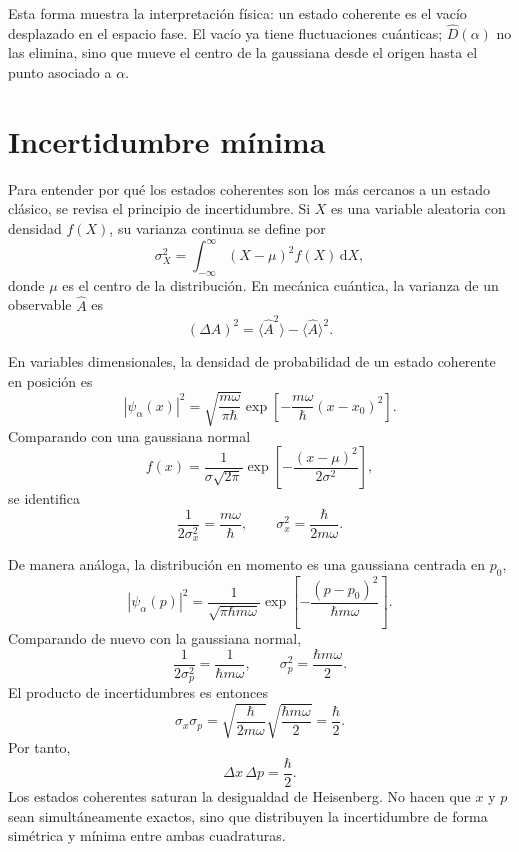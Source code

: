 \documentclass[11pt]{article}
\newcommand{\dd}{\mathrm{d}}
\begin{document}
Esta forma muestra la interpretaci\'on f\'isica: un estado coherente es el
vac\'io desplazado en el espacio fase. El vac\'io ya tiene fluctuaciones
cu\'anticas; $\hat D(\alpha)$ no las elimina, sino que mueve el centro de la
gaussiana desde el origen hasta el punto asociado a $\alpha$.

\section{Incertidumbre m\'inima}

Para entender por qu\'e los estados coherentes son los m\'as cercanos a un
estado cl\'asico, se revisa el principio de incertidumbre. Si $X$ es una
variable aleatoria con densidad $f(X)$, su varianza continua se define por
\begin{equation}
  \sigma_X^2
  =
  \int_{-\infty}^{\infty}(X-\mu)^2f(X)\,\dd X,
\end{equation}
donde $\mu$ es el centro de la distribuci\'on. En mec\'anica cu\'antica, la
varianza de un observable $\hat A$ es
\begin{equation}
  (\Delta A)^2
  =
  \langle \hat A^2\rangle-\langle \hat A\rangle^2.
\end{equation}

En variables dimensionales, la densidad de probabilidad de un estado coherente
en posici\'on es
\begin{equation}
  |\psi_\alpha(x)|^2
  =
  \sqrt{\frac{m\omega}{\pi\hbar}}
  \exp\left[-\frac{m\omega}{\hbar}(x-x_0)^2\right].
\end{equation}
Comparando con una gaussiana normal
\begin{equation}
  f(x)=\frac{1}{\sigma\sqrt{2\pi}}
  \exp\left[-\frac{(x-\mu)^2}{2\sigma^2}\right],
\end{equation}
se identifica
\begin{equation}
  \frac{1}{2\sigma_x^2}=\frac{m\omega}{\hbar},
  \qquad
  \sigma_x^2=\frac{\hbar}{2m\omega}.
\end{equation}

De manera an\'aloga, la distribuci\'on en momento es una gaussiana centrada en
$p_0$,
\begin{equation}
  |\psi_\alpha(p)|^2
  =
  \frac{1}{\sqrt{\pi\hbar m\omega}}
  \exp\left[-\frac{(p-p_0)^2}{\hbar m\omega}\right].
\end{equation}
Comparando de nuevo con la gaussiana normal,
\begin{equation}
  \frac{1}{2\sigma_p^2}=\frac{1}{\hbar m\omega},
  \qquad
  \sigma_p^2=\frac{\hbar m\omega}{2}.
\end{equation}
El producto de incertidumbres es entonces
\begin{equation}
  \sigma_x\sigma_p
  =
  \sqrt{\frac{\hbar}{2m\omega}}
  \sqrt{\frac{\hbar m\omega}{2}}
  =
  \frac{\hbar}{2}.
\end{equation}
Por tanto,
\begin{equation}
  \boxed{\Delta x\,\Delta p=\frac{\hbar}{2}.}
\end{equation}
Los estados coherentes saturan la desigualdad de Heisenberg. No hacen que
$x$ y $p$ sean simult\'aneamente exactos, sino que distribuyen la incertidumbre
de forma sim\'etrica y m\'inima entre ambas cuadraturas.
\end{document}
